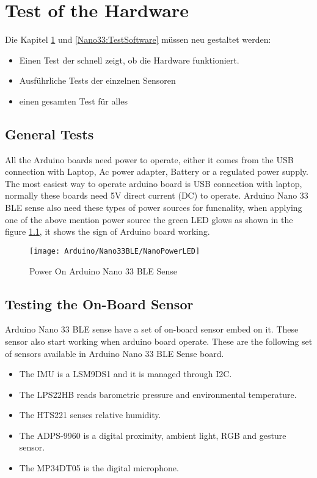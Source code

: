 %
%




\chapter{Test of the Hardware}\label{Nano33:TestHardware}

Die Kapitel \ref{Nano33:TestHardware} und \ref{Nano33:TestSoftware} müssen neu gestaltet werden:

\begin{itemize}
  \item Einen Test der schnell zeigt, ob die Hardware funktioniert.
  \item Ausführliche Tests der einzelnen Sensoren
  \item einen gesamten Test für alles
\end{itemize}  

\section{General Tests}

All the Arduino boards need power to operate, either it comes from the USB connection with Laptop, Ac power adapter, Battery or a regulated power supply. The most easiest way to operate arduino board is USB connection with laptop, normally these boards need 5V direct current (DC) to operate. Arduino Nano 33 BLE sense also need these types of power sources for funcnality, when applying one of the above mention power source the green LED glows as shown in the figure \ref{fig:Test}, it shows the sign of Arduino board working.

\begin{figure}[htbp]
    \centering
    \texttt{[image: Arduino/Nano33BLE/NanoPowerLED]}
    \caption{Power On Arduino Nano 33 BLE Sense}
    \label{fig:Test}
\end{figure}

\section{Testing the On-Board Sensor}

Arduino Nano 33 BLE sense have a set of on-board sensor embed on it. These sensor also start working when arduino board operate. These are the following set of sensors available in Arduino Nano 33 BLE Sense board.
\begin{itemize}
    \item The IMU is a LSM9DS1 and it is managed through I2C.
    \item The LPS22HB reads barometric pressure and environmental temperature.
    \item The HTS221 senses relative humidity.
    \item The ADPS-9960 is a digital proximity, ambient light, RGB and gesture sensor.
    \item The MP34DT05 is the digital microphone.
\end{itemize} 

